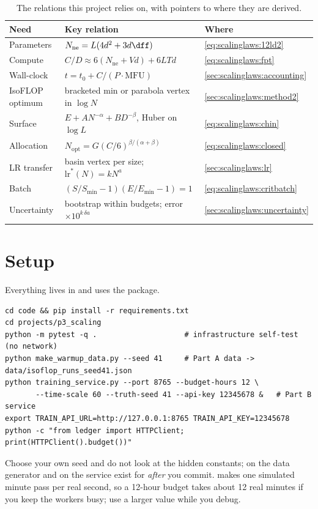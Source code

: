 \begin{table}[h]
\centering\small
\begin{tabularx}{\linewidth}{@{}lXl@{}}
\toprule
\textbf{Need} & \textbf{Key relation} & \textbf{Where}\\
\midrule
Parameters & $N_{\text{ne}} = L(4d^2+3d\dff)$ & \cref{eq:scalinglaws:12ld2}\\
Compute & $C/D \approx 6(N_{\text{ne}}+Vd)+6LTd$ & \cref{eq:scalinglaws:fpt}\\
Wall-clock & $t = t_0 + C/(P\cdot\mathrm{MFU})$ & \cref{sec:scalinglaws:accounting}\\
IsoFLOP optimum & bracketed min or parabola vertex in $\log N$ & \cref{sec:scalinglaws:method2}\\
Surface & $E + A N^{-\alpha} + B D^{-\beta}$, Huber on $\log L$ & \cref{eq:scalinglaws:chin}\\
Allocation & $N_{\text{opt}} = G (C/6)^{\beta/(\alpha+\beta)}$ & \cref{eq:scalinglaws:closed}\\
LR transfer & basin vertex per size; $\text{lr}^*(N) = kN^{a}$ & \cref{sec:scalinglaws:lr}\\
Batch & $(S/S_{\min}-1)(E/E_{\min}-1)=1$ & \cref{eq:scalinglaws:critbatch}\\
Uncertainty & bootstrap within budgets; error $\times10^{k\,\delta a}$ & \cref{sec:scalinglaws:uncertainty}\\
\bottomrule
\end{tabularx}
\caption{The relations this project relies on, with pointers to where they are derived.}
\label{tab:proj3:cheat}
\end{table}

\section{Setup}\label{sec:proj3:setup}

Everything lives in  and uses the  package.
\begin{lstlisting}[style=shell]
cd code && pip install -r requirements.txt
cd projects/p3_scaling
python -m pytest -q .                    # infrastructure self-test (no network)
python make_warmup_data.py --seed 41     # Part A data -> data/isoflop_runs_seed41.json
python training_service.py --port 8765 --budget-hours 12 \
       --time-scale 60 --truth-seed 41 --api-key 12345678 &   # Part B service
export TRAIN_API_URL=http://127.0.0.1:8765 TRAIN_API_KEY=12345678
python -c "from ledger import HTTPClient; print(HTTPClient().budget())"
\end{lstlisting}
Choose your own seed and do not look at the hidden constants;  on the data
generator and \code{GET /score} on the service exist for \emph{after} you commit.
\code{--time-scale 60} makes one simulated minute pass per real second, so a 12-hour budget takes
about 12 real minutes if you keep the workers busy; use a larger value while you debug.

